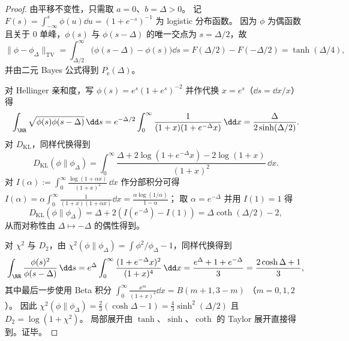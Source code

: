 \begin{proof}
由平移不变性，只需取 \(a=0\)、\(b=\Delta>0\)。
记 \(F(s)=\int_{-\infty}^{s}\phi(u)\dd u=(1+e^{-s})^{-1}\) 为 logistic 分布函数。
因为 \(\phi\) 为偶函数且关于 \(0\) 单峰，\(\phi(s)\) 与 \(\phi(s-\Delta)\) 的唯一交点为 \(s=\Delta/2\)，故
\[
\|\phi-\phi_{\Delta}\|_{\mathrm{TV}}
=\int_{\Delta/2}^{\infty}\bigl(\phi(s-\Delta)-\phi(s)\bigr)\dd s
=F(\Delta/2)-F(-\Delta/2)
=\tanh(\Delta/4),
\]
并由二元 Bayes 公式得到 \(P_{\mathrm e}(\Delta)\)。
\par
对 Hellinger 亲和度，写 \(\phi(s)=e^{s}(1+e^{s})^{-2}\) 并作代换 \(x=e^{s}\)（\(\dd s=\dd x/x\)）得
\[
\int_{\RR}\sqrt{\phi(s)\phi(s-\Delta)}\,\dd s
=e^{-\Delta/2}\int_{0}^{\infty}\frac{1}{(1+x)(1+e^{-\Delta}x)}\,\dd x
=\frac{\Delta}{2\sinh(\Delta/2)}.
\]
对 \(D_{\mathrm{KL}}\)，同样代换得到
\[
D_{\mathrm{KL}}(\phi\|\phi_{\Delta})
=\int_{0}^{\infty}\frac{\Delta+2\log(1+e^{-\Delta}x)-2\log(1+x)}{(1+x)^{2}}\,\dd x.
\]
对
\(
I(\alpha):=\int_{0}^{\infty}\frac{\log(1+\alpha x)}{(1+x)^{2}}\,\dd x
\)
作分部积分可得
\(
I(\alpha)=\alpha\int_{0}^{\infty}\frac{1}{(1+x)(1+\alpha x)}\dd x
=\frac{\alpha\log(1/\alpha)}{1-\alpha}
\)；
取 \(\alpha=e^{-\Delta}\) 并用 \(I(1)=1\) 得
\[
D_{\mathrm{KL}}(\phi\|\phi_{\Delta})
=\Delta+2(I(e^{-\Delta})-I(1))
=\Delta\coth(\Delta/2)-2,
\]
从而对称性由 \(\Delta\mapsto-\Delta\) 的偶性得到。
\par
对 \(\chi^2\) 与 \(D_2\)，由
\(
\chi^2(\phi\|\phi_{\Delta})=\int \phi^2/\phi_{\Delta}-1
\)，同样代换得到
\[
\int_{\RR}\frac{\phi(s)^2}{\phi(s-\Delta)}\,\dd s
=e^{\Delta}\int_{0}^{\infty}\frac{(1+e^{-\Delta}x)^{2}}{(1+x)^{4}}\,\dd x
=\frac{e^{\Delta}+1+e^{-\Delta}}{3}
=\frac{2\cosh\Delta+1}{3},
\]
其中最后一步使用 Beta 积分
\(
\int_{0}^{\infty}\frac{x^{m}}{(1+x)^{4}}\dd x=B(m+1,3-m)
\)
（\(m=0,1,2\)）。
因此
\(
\chi^2(\phi\|\phi_{\Delta})=\frac{2}{3}(\cosh\Delta-1)=\frac{4}{3}\sinh^{2}(\Delta/2)
\)
且 \(D_2=\log(1+\chi^2)\)。
局部展开由 \(\tanh\)、\(\sinh\)、\(\coth\) 的 Taylor 展开直接得到。证毕。
\end{proof}


